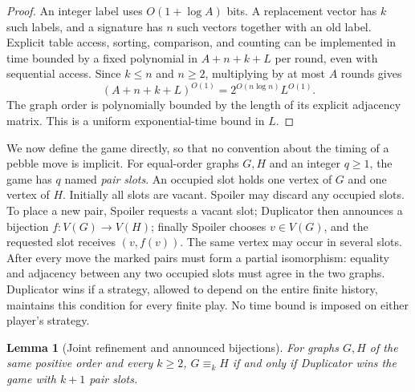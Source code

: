 \documentclass[11pt]{article}
\newtheorem{lemma}[theorem]{Lemma}
\theoremstyle{definition}
\begin{document}
\begin{proof}
An integer label uses $O(1+\log A)$ bits.  A replacement vector has $k$
such labels, and a signature has $n$ such vectors together with an old
label.  Explicit table access, sorting, comparison, and counting can be
implemented in time bounded by a fixed polynomial in $A+n+k+L$ per round,
even with sequential access.  Since $k\leq n$ and $n\geq 2$, multiplying
by at most $A$ rounds gives
\[
 (A+n+k+L)^{O(1)}=2^{O(n\log n)}L^{O(1)}.
\]
The graph order is polynomially bounded by the length of its explicit
adjacency matrix.  This is a uniform exponential-time bound in $L$.
\end{proof}

We now define the game directly, so that no convention about the timing of
a pebble move is implicit.  For equal-order graphs $G,H$ and an integer
$q\geq 1$, the game has $q$ named \emph{pair slots}.  An occupied slot holds
one vertex of $G$ and one vertex of $H$.  Initially all slots are vacant.
Spoiler may discard any occupied slots.  To place a new pair, Spoiler
requests a vacant slot; Duplicator then announces a bijection
$f:V(G)\to V(H)$; finally Spoiler chooses $v\in V(G)$, and the requested
slot receives $(v,f(v))$.  The same vertex may occur in several slots.
After every move the marked pairs must form a partial isomorphism: equality
and adjacency between any two occupied slots must agree in the two graphs.
Duplicator wins if a strategy, allowed to depend on the entire finite
history, maintains this condition for every finite play.  No time bound is
imposed on either player's strategy.

\begin{lemma}[Joint refinement and announced bijections]
\label{lem:wl-game}
For graphs $G,H$ of the same positive order and every $k\geq 2$,
$G\equiv_k H$ if and only if Duplicator wins the game with $k+1$ pair slots.
\end{lemma}
\end{document}
